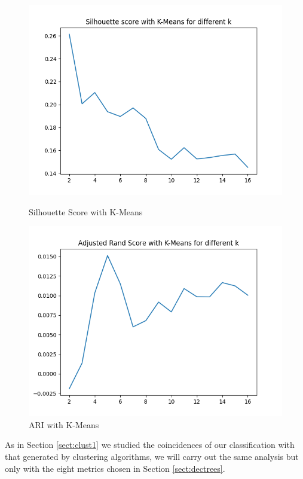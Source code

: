 \begin{figure}[t]
	\begin{minipage}[b]{0.37\paperwidth}
		\centerline{\includegraphics[width=\textwidth]{Imagenes/Bitmap/Clustering/kmeans8sil.png}}%
		\caption{Silhouette Score with K-Means}%
		\label{fig:8kmeanssil}
	\end{minipage}
	\begin{minipage}[b]{0.37\paperwidth}
		\centerline{\includegraphics[width=\textwidth]{Imagenes/Bitmap/Clustering/kmeans8ari.png}}%
		\caption{ARI with K-Means}%
		\label{fig:8kmeansari}
	\end{minipage}
\end{figure}

As in Section \ref{sect:clust1} we studied the coincidences of our classification with that generated by clustering algorithms, we will carry out the same analysis but only with the eight metrics chosen in Section \ref{sect:dectrees}.

